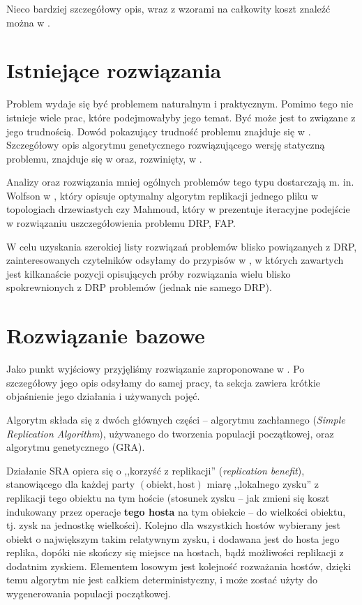 \documentclass[11pt,pdftex,a4paper]{scrartcl}
\begin{document}
Nieco bardziej szczegółowy opis, wraz z wzorami na całkowity koszt znaleźć można w \cite{Ahmad}.

\section{Istniejące rozwiązania}
Problem wydaje się być problemem naturalnym i praktycznym. Pomimo tego nie istnieje wiele prac, które podejmowałyby jego temat. Być może jest to związane z jego trudnością. Dowód pokazujący trudność problemu znajduje się w \cite{newAhmad}. Szczegółowy opis algorytmu genetycznego rozwiązującego wersję statyczną problemu, znajduje się w \cite{Ahmad} oraz, rozwinięty, w \cite{newAhmad}.

Analizy oraz rozwiązania mniej ogólnych problemów tego typu dostarczają m. in. Wolfson w \cite{Wolfson}, który opisuje optymalny algorytm replikacji jednego pliku w topologiach drzewiastych czy Mahmoud, który w \cite{Mahmoud} prezentuje iteracyjne podejście w rozwiązaniu uszczegółowienia problemu DRP, FAP.

W celu uzyskania szerokiej listy rozwiązań problemów blisko powiązanych z DRP, zainteresowanych czytelników odsyłamy do przypisów w \cite{newAhmad}, w których zawartych jest kilkanaście pozycji opisujących próby rozwiązania wielu blisko spokrewnionych z DRP problemów (jednak nie samego DRP).

\section{Rozwiązanie bazowe}
Jako punkt wyjściowy przyjęliśmy rozwiązanie zaproponowane w \cite{Ahmad}. Po szczegółowy jego opis
odsyłamy do samej pracy, ta sekcja zawiera krótkie objaśnienie jego działania i używanych pojęć.

Algorytm składa się z dwóch głównych części -- algorytmu zachłannego (\textit{Simple Replication 
Algorithm}), używanego do tworzenia populacji początkowej, oraz algorytmu genetycznego (GRA).

Działanie SRA opiera się o ,,korzyść z replikacji'' (\textit{replication benefit}), stanowiącego
dla każdej party \((\textrm{obiekt}, \textrm{host})\) miarę ,,lokalnego zysku'' z replikacji tego
obiektu na tym hoście (stosunek zysku -- jak zmieni się koszt indukowany przez operacje 
\textbf{tego hosta} na tym obiekcie -- do wielkości obiektu, tj. zysk na jednostkę wielkości).
Kolejno dla wszystkich hostów wybierany jest obiekt o największym takim relatywnym zysku, i dodawana
jest do hosta jego replika, dopóki nie skończy się miejsce na hostach, bądź możliwości replikacji
z dodatnim zyskiem. Elementem losowym jest kolejność rozważania hostów, dzięki temu algorytm
nie jest całkiem deterministyczny, i może zostać użyty do wygenerowania populacji początkowej.
\end{document}
